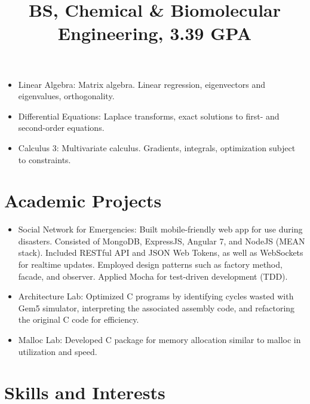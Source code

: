 \documentclass[12pt]{res} %
\begin{document}
\begin{resume}
          \title{\textbf{BS, Chemical \& Biomolecular Engineering, 3.39 GPA}}
          \begin{position}
            \vspace{-14pt}
            \begin{itemize}[leftmargin=-0.4cm]
            \itemsep0em
            \item Linear Algebra: Matrix algebra. Linear regression, eigenvectors and eigenvalues, orthogonality.
            \item Differential Equations: Laplace transforms, exact solutions to first- and second-order equations.
            \item Calculus 3: Multivariate calculus. Gradients, integrals, optimization subject to constraints.
            \end{itemize}
          \end{position}
          \vspace{-12pt}

        \section{Academic Projects}
          \begin{itemize}[leftmargin=-0.4cm]
          \itemsep0em
          \item Social Network for Emergencies: Built mobile-friendly web app for use during disasters. Consisted of MongoDB, ExpressJS, Angular 7, and NodeJS (MEAN stack). Included RESTful API and JSON Web Tokens, as well as WebSockets for realtime updates. Employed design patterns such as factory method, facade, and observer. Applied Mocha for test-driven development (TDD).
          \item Architecture Lab: Optimized C programs by identifying cycles wasted with Gem5 simulator, interpreting the associated assembly code, and refactoring the original C code for efficiency.
          \item Malloc Lab: Developed C package for memory allocation similar to malloc in utilization and speed.
          \end{itemize}
          \vspace{-12pt}

        \section{Skills and Interests}
          \vspace{3pt}


\end{resume}
\end{document}

